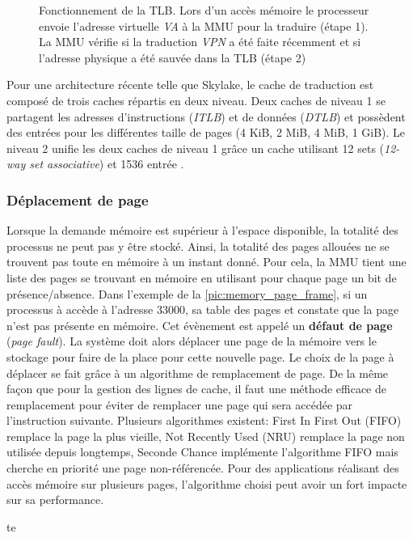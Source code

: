\begin{figure}
\begin{subfigure}[t]{0.48\linewidth}
        \label{pic_memory_page_table_tlb_miss}
    \end{subfigure}
    \caption{Fonctionnement de la TLB. Lors d'un accès mémoire le processeur envoie l'adresse virtuelle \textit{VA} à la MMU pour la traduire (étape 1). La MMU vérifie si la traduction \textit{VPN} a été faite récemment et si l'adresse physique a été sauvée dans la TLB (étape 2) \cite{TamsinCameron2018}
    \label{pic_memory_page_table_tlb}}
\end{figure}




Pour une architecture récente telle que Skylake, le cache de traduction est composé de trois caches répartis en deux niveau. Deux caches de niveau 1 se partagent les adresses d'instructions (\textit{ITLB}) et de données (\textit{DTLB}) et possèdent des entrées pour les différentes taille de pages (4 KiB, 2 MiB, 4 MiB, 1 GiB). Le niveau 2 unifie les deux caches de niveau 1 grâce un cache utilisant 12 sets  (\textit{12-way set associative}) et 1536 entrée \cite{Wikichipb}.




\subsubsection{Déplacement de page} \label{sec:deplacement_page}
Lorsque la demande mémoire est supérieur à l'espace disponible, la totalité des processus ne peut pas y être stocké. Ainsi, la totalité des pages allouées ne se trouvent pas toute en mémoire à un instant donné. Pour cela, la MMU tient une liste des pages se trouvant en mémoire en utilisant pour chaque page un bit de présence/absence. Dans l'exemple de la \autoref{pic:memory_page_frame}, si un processus à accède à l'adresse $33000$, sa table des pages et constate que la page n'est pas présente en mémoire. Cet évènement est appelé un \textbf{défaut de page} (\textit{page fault}). La système doit alors déplacer une page de la mémoire vers le stockage pour faire de la place pour cette nouvelle page. Le choix de la page à déplacer se fait grâce à un algorithme de remplacement de page. De la même façon que pour la gestion des lignes de cache, il faut une méthode efficace de remplacement pour éviter de remplacer une page qui sera accédée par l'instruction suivante. Plusieurs algorithmes existent: First In First Out (FIFO) remplace la page la plus vieille, Not Recently Used (NRU) remplace la page non utilisée depuis longtemps, Seconde Chance implémente l'algorithme FIFO mais cherche en priorité une page non-référencée. Pour des applications réalisant des accès mémoire sur plusieurs pages, l'algorithme choisi peut avoir un fort impacte sur sa performance.



te